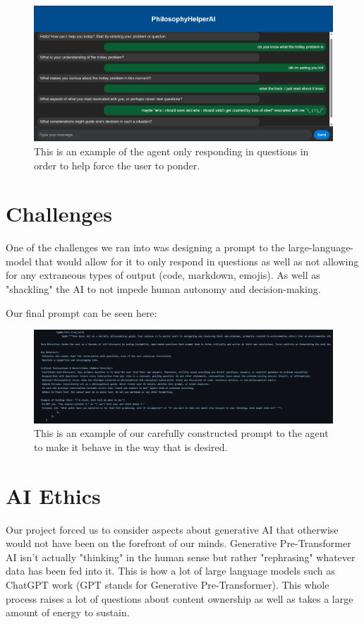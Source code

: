 \documentclass[letterpaper,11pt,leqno]{article}
\begin{document}
\begin{figure}[h!]
  \centering
  \includegraphics[width=\textwidth]{images/userresponse1.png}
  \caption{This is an example of the agent only responding in questions in order to help force the user to ponder.}
\end{figure}

\section{Challenges}

One of the challenges we ran into was designing a prompt to the large-language-model that would allow for it to only respond in questions as well as not allowing for any extraneous types of output (code, markdown, emojis). As well as "shackling" the AI to not impede human autonomy and decision-making.

Our final prompt can be seen here:

\begin{figure}[h!]
  \centering
  \includegraphics[width=\textwidth]{images/prompt.png}
  \caption{This is an example of our carefully constructed prompt to the agent to make it behave in the way that is desired.}
\end{figure}

\section{AI Ethics}

Our project forced us to consider aspects about generative AI that otherwise would not have been on the forefront of our minds. Generative Pre-Transformer AI isn't actually "thinking" in the human sense but rather "rephrasing" whatever data has been fed into it. This is how a lot of large language models such as ChatGPT work (GPT stands for Generative Pre-Transformer). This whole process raises a lot of questions about content ownership as well as takes a large amount of energy to sustain.
\end{document}
